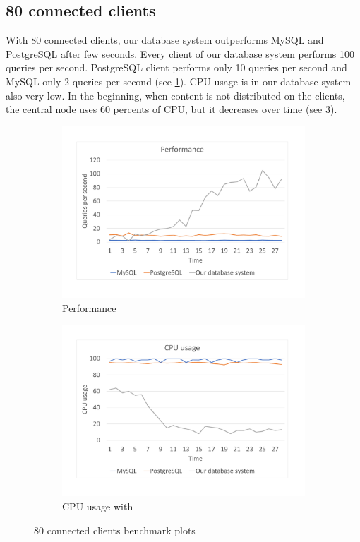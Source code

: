 \subsection*{80 connected clients}
With 80 connected clients, our database system outperforms MySQL and PostgreSQL after few seconds. Every client of our database system performs 100 queries per second. PostgreSQL client performs only 10 queries per second and MySQL only 2 queries per second (see \ref{bench80per}). CPU usage is in our database system also very low. In the beginning, when content is not distributed on the clients, the central node uses 60 percents of CPU, but it decreases over time (see \ref{bench80cpu}).


\begin{figure}[h]
    \begin{subfigure}{.5\textwidth}
        \centering
        \includegraphics[trim={1.78cm 2cm 2.08cm 1cm},clip,width=1.0\linewidth]{excel/80per.pdf}
        \caption{Performance}
        \label{bench80per}
    \end{subfigure}
    \begin{subfigure}{.5\textwidth}
        \centering
        \includegraphics[trim={1.78cm 2cm 2.08cm 1cm},clip,width=1.0\linewidth]{excel/80cpu.pdf}
        \caption{CPU usage with}
        \label{bench80cpu}
    \end{subfigure}
    \caption{80 connected clients benchmark plots}
\end{figure}



